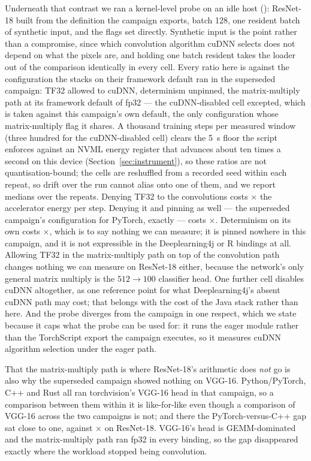 Underneath that contrast we ran a kernel-level probe on an idle host
(): ResNet-18 built from the definition the campaign
exports, batch 128, one resident batch of synthetic input, and the flags set
directly. Synthetic input is the point rather than a compromise, since which
convolution algorithm cuDNN selects does not depend on what the pixels are, and
holding one batch resident takes the loader out of the comparison identically in
every cell. Every ratio here is against the configuration the stacks on their
framework default ran in the superseded campaign: TF32 allowed to cuDNN, determinism unpinned, the
matrix-multiply path at its framework default of fp32 --- the cuDNN-disabled
cell excepted, which is taken against this campaign's own default, the only
configuration whose matrix-multiply flag it shares. A thousand training steps
per measured window (three hundred for the cuDNN-disabled cell) clears the \SI{5}{\second} floor the script enforces against
an NVML energy register that advances about ten times a second on this device
(Section~\ref{sec:instrument}), so these ratios are not quantisation-bound; the
cells are reshuffled from a recorded seed within each repeat, so drift over the
run cannot alias onto one of them, and we report medians over the repeats.
Denying TF32 to the convolutions costs \vPrecisionKernelEnergyRatio$\times$ the
accelerator energy per step. Denying it and pinning 
as well --- the superseded campaign's configuration for PyTorch, exactly --- costs
\vPrecisionKernelDetEnergyRatio$\times$. Determinism on its own costs
\vPrecisionKernelDetOnlyRatio$\times$, which is to say nothing we can measure; it
is pinned nowhere in this campaign, and it is not expressible in the
Deeplearning4j or R bindings at all. Allowing TF32 in the matrix-multiply path
on top of the convolution path changes nothing we can measure on ResNet-18
either, because the network's only general matrix multiply is the $512\to100$
classifier head. One further cell disables cuDNN altogether, as one reference
point for what Deeplearning4j's absent cuDNN path may cost; that belongs with the cost of the
Java stack rather than here. And the probe diverges from the campaign in one
respect, which we state because it caps what the probe can be used for: it runs
the eager module rather than the TorchScript export the campaign executes, so it
measures cuDNN algorithm selection under the eager path.

That the matrix-multiply path is where ResNet-18's arithmetic does \emph{not} go
is also why the superseded campaign showed nothing on VGG-16. Python/PyTorch,
C++ and Rust all ran torchvision's VGG-16 head in that campaign, so a comparison
between them within it is like-for-like even though a comparison of VGG-16
across the two campaigns is not; and there the PyTorch-versus-C++ gap sat close
to one, against \vPrecisionGapBefore$\times$ on ResNet-18. VGG-16's head is
GEMM-dominated and the matrix-multiply path ran fp32 in every binding, so the
gap disappeared exactly where the workload stopped being convolution.

